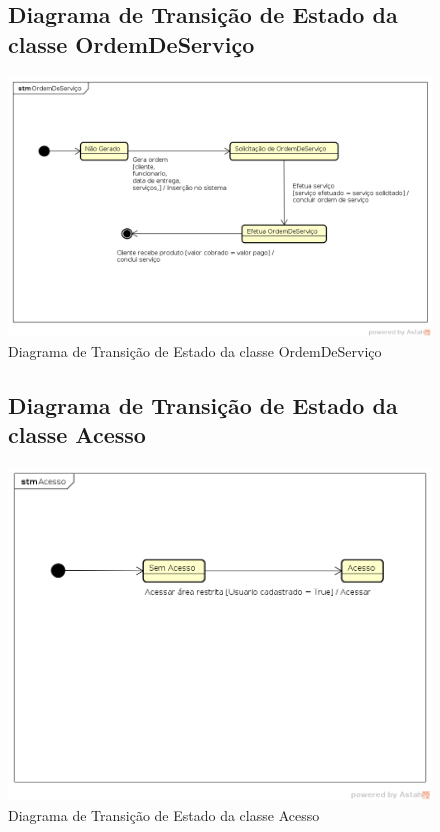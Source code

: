 \documentclass[
	12pt,				%
	openright,
	oneside,			%
	a4paper,			%
	chapter=TITLE,		%
	brazil				%
	]{abntex2}
\begin{document}
\begin{figure}[h!]
\subsection{Diagrama de Transição de Estado da classe OrdemDeServiço}
	\caption{Diagrama de Transição de Estado da classe OrdemDeServiço}
	\begin{center}
	    \includegraphics[scale=0.5]{Arquivos/DTE/OrdemDeServico}  
	\end{center}
\end{figure}

\begin{figure}[h!]
\subsection{Diagrama de Transição de Estado da classe Acesso}
	\caption{Diagrama de Transição de Estado da classe Acesso}
	\begin{center}
	    \includegraphics[scale=0.6]{Arquivos/DTE/Acesso}  
	\end{center}
\end{figure}
\end{document}

